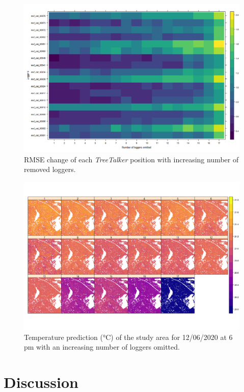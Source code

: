\documentclass[5p]{elsarticle} %
\begin{document}
\begin{figure}[h]
\begin{center}
\includegraphics[scale=0.5]{heatmap_treetalker_rmse}
\caption{RMSE change of each \emph{TreeTalker} position with increasing number of removed loggers.}
\end{center}
\end{figure}

\begin{figure}[t]
\begin{center}
\includegraphics[scale=0.5]{full_prediction_study_area}
\caption{Temperature prediction (°C) of the study area for 12/06/2020 at 6 pm with an increasing number of loggers omitted.
}
\end{center}
\end{figure}

\hypertarget{discussion}{%
\section{Discussion}\label{discussion}}
\end{document}
